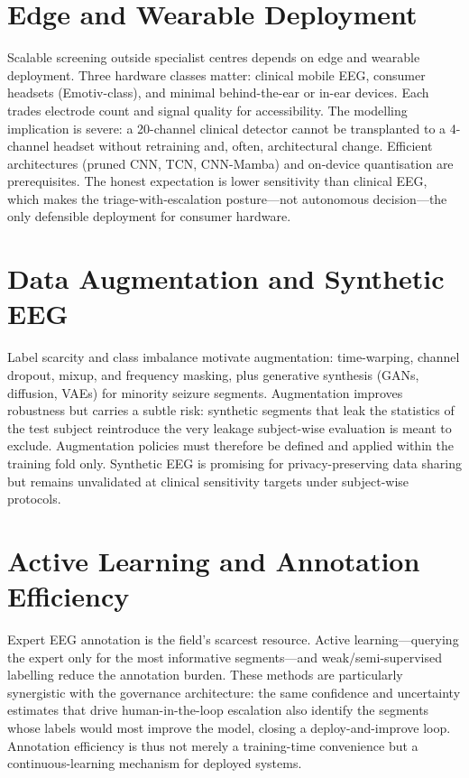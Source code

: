 \section{Edge and Wearable Deployment}
Scalable screening outside specialist centres depends on edge and wearable deployment. Three hardware classes matter: clinical mobile EEG, consumer headsets (Emotiv-class), and minimal behind-the-ear or in-ear devices. Each trades electrode count and signal quality for accessibility. The modelling implication is severe: a 20-channel clinical detector cannot be transplanted to a 4-channel headset without retraining and, often, architectural change. Efficient architectures (pruned CNN, TCN, CNN-Mamba) and on-device quantisation are prerequisites. The honest expectation is lower sensitivity than clinical EEG, which makes the triage-with-escalation posture---not autonomous decision---the only defensible deployment for consumer hardware.

\section{Data Augmentation and Synthetic EEG}
Label scarcity and class imbalance motivate augmentation: time-warping, channel dropout, mixup, and frequency masking, plus generative synthesis (GANs, diffusion, VAEs) for minority seizure segments. Augmentation improves robustness but carries a subtle risk: synthetic segments that leak the statistics of the test subject reintroduce the very leakage subject-wise evaluation is meant to exclude. Augmentation policies must therefore be defined and applied within the training fold only. Synthetic EEG is promising for privacy-preserving data sharing but remains unvalidated at clinical sensitivity targets under subject-wise protocols.

\section{Active Learning and Annotation Efficiency}
Expert EEG annotation is the field's scarcest resource. Active learning---querying the expert only for the most informative segments---and weak/semi-supervised labelling reduce the annotation burden. These methods are particularly synergistic with the governance architecture: the same confidence and uncertainty estimates that drive human-in-the-loop escalation also identify the segments whose labels would most improve the model, closing a deploy-and-improve loop. Annotation efficiency is thus not merely a training-time convenience but a continuous-learning mechanism for deployed systems.

